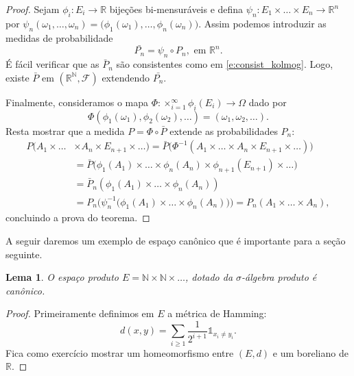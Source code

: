 \documentclass[reqno, draft]{book}
\newcommand*\1{\mathds{1}}
\newtheorem{lemma}[theorem]{Lema}
\begin{document}
\begin{proof}
  Sejam $\phi_i: E_i \to \mathbb{R}$ bijeções bi-mensuráveis e defina $\psi_n: E_1 \times \dots \times E_n \to \mathbb{R}^n$ por $\psi_n(\omega_1, \dots, \omega_n) = \big(\phi_1(\omega_1), \dots, \phi_n(\omega_n)\big)$.
  Assim podemos introduzir as medidas de probabilidade
  \begin{equation}
    \bar{P_n} = \psi_n \circ P_n, \text{ em $\mathbb{R}^n$}.
  \end{equation}
  É fácil verificar que as $\bar P_n$ são consistentes como em \eqref{e:consist_kolmog}.
  Logo, existe $\bar{P}$ em $(\mathbb{R}^\mathbb{N}, \mathcal{F})$ extendendo $\bar{P_n}$.

  Finalmente, consideramos o mapa $\Phi: \times_{i=1}^\infty \phi_i(E_i) \to \Omega$ dado por
  \begin{equation}
    \Phi(\phi_1(\omega_1), \phi_2(\omega_2), \dots) = (\omega_1, \omega_2, \dots).
  \end{equation}
  Resta mostrar que a medida $P = \Phi \circ \bar{P}$ extende as probabilidades $P_n$:
  \begin{equation}
    \begin{split}
      P\big(A_1 \times \dots & \times A_n \times E_{n+1} \times \dots\big) = \bar{P} \big(\Phi^{-1}(A_1 \times \dots \times A_n \times E_{n+1} \times \dots)\big)\\
      & = \bar{P} \big( \phi_1(A_1) \times \dots \times \phi_n(A_n) \times \phi_{n+1}(E_{n+1}) \times \dots \big)\\
      & = \bar{P}_n (\phi_1(A_1) \times \dots \times \phi_n(A_n))\\
      & = P_n \big(\psi_n^{-1}\big(\phi_1(A_1) \times \dots \times \phi_n(A_n)\big)\big) = P_n(A_1 \times \dots \times A_n),
    \end{split}
  \end{equation}
  concluindo a prova do teorema.
\end{proof}

A seguir daremos um exemplo de espaço canônico que é importante para a seção seguinte.

\begin{lemma}
  \label{l:NN_canonico}
  O espaço produto $E = \mathbb{N} \times \mathbb{N} \times \dots$, dotado da $\sigma$-álgebra produto é canônico.
\end{lemma}

\begin{proof}
  Primeiramente definimos em $E$ a métrica de Hamming:
  \begin{equation}
    \label{e:hamming_distance}
    d(x,y) = \sum_{i \geq 1} \frac{1}{2^{i + 1}} \1_{x_i \neq y_i}.
  \end{equation}
  Fica como exercício mostrar um homeomorfismo entre $(E,d)$ e um boreliano de $\mathbb{R}$.
\end{proof}
\end{document}
